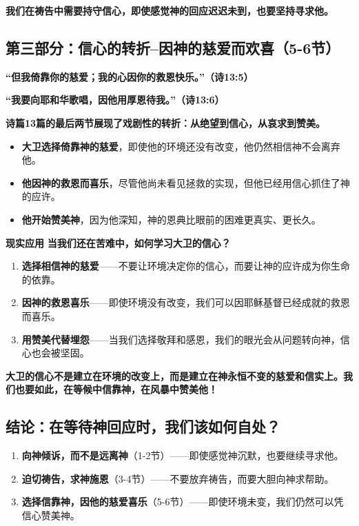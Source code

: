 \documentclass[a4paper, 12pt]{article}
\begin{document}
\textbf{我们在祷告中需要持守信心，即使感觉神的回应迟迟未到，也要坚持寻求他。}



\subsection*{第三部分：信心的转折--因神的慈爱而欢喜（5-6节）}
 
\hspace{0.4cm}\textbf{“但我倚靠你的慈爱；我的心因你的救恩快乐。”（诗13:5）}  

\textbf{“我要向耶和华歌唱，因他用厚恩待我。”（诗13:6）}  

\vspace{0.2cm}

\textbf{诗篇13篇的最后两节展现了戏剧性的转折：从绝望到信心，从哀求到赞美。}

\begin{itemize}
    \item \textbf{大卫选择倚靠神的慈爱}，即使他的环境还没有改变，他仍然相信神不会离弃他。  
    \item \textbf{他因神的救恩而喜乐}，尽管他尚未看见拯救的实现，但他已经用信心抓住了神的应许。
    \item \textbf{他开始赞美神}，因为他深知，神的恩典比眼前的困难更真实、更长久。 
\end{itemize}


\textbf{现实应用 } 
\textbf{当我们还在苦难中，如何学习大卫的信心？}

\begin{enumerate}
    \item \textbf{选择相信神的慈爱}——不要让环境决定你的信心，而要让神的应许成为你生命的依靠。
    \item \textbf{因神的救恩喜乐}——即使环境没有改变，我们可以因耶稣基督已经成就的救恩而喜乐。  
    \item \textbf{用赞美代替埋怨}——当我们选择敬拜和感恩，我们的眼光会从问题转向神，信心也会被坚固。  
\end{enumerate}

\textbf{大卫的信心不是建立在环境的改变上，而是建立在神永恒不变的慈爱和信实上。我们也要如此，在等候中信靠神，在风暴中赞美他！}



\subsection*{结论：在等待神回应时，我们该如何自处？}

\begin{enumerate}
    \item \textbf{向神倾诉，而不是远离神}（1-2节）——即使感觉神沉默，也要继续寻求他。
    \item \textbf{迫切祷告，求神施恩}（3-4节）——不要放弃祷告，而要大胆向神求帮助。 
    \item \textbf{选择信靠神，因他的慈爱喜乐}（5-6节）——即使环境未变，我们仍然可以凭信心赞美神。  
\end{enumerate}
\end{document}
